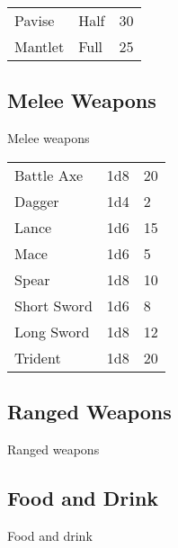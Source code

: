 \begin{multicols}{2}
\begin{center}
{
\begin{xtabular}{|l|l|l|}
Pavise & Half & 30 \\
Mantlet & Full & 25 \\
\hline
\end{xtabular}
}
\end{center}

\subsection{Melee Weapons}

Melee weapons

\begin{center}
{
\begin{xtabular}{|l|l|l|}
Battle Axe & 1d8 & 20 \\
Dagger & 1d4 & 2 \\
Lance & 1d6 & 15 \\
Mace & 1d6 & 5 \\
Spear & 1d8 & 10 \\
Short Sword & 1d6 & 8 \\
Long Sword & 1d8 & 12 \\
Trident & 1d8 & 20 \\
\hline
\end{xtabular}
}
\end{center}

\subsection{Ranged Weapons}

Ranged weapons

\subsection{Food and Drink}

Food and drink


\end{multicols}
